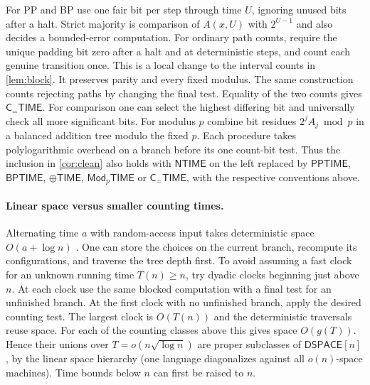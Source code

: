 \documentclass[11pt]{article}
\theoremstyle{definition}
\theoremstyle{remark}
\newcommand{\NTIME}{\mathsf{NTIME}}
\begin{document}
For PP and BP use one fair bit per step through time $U$, ignoring
unused bits after a halt. Strict majority is comparison of $A(x,U)$
with $2^{U-1}$ and also decides a bounded-error computation. For
ordinary path counts, require the unique padding bit zero after a halt
and at deterministic steps, and count each genuine transition once.
This is a local change to the interval counts in \cref{lem:block}.
It preserves parity and every fixed modulus. The same construction
counts rejecting paths by changing the final test. Equality of the
two counts gives $\mathsf C_{=}\mathsf{TIME}$.
For comparison one can select the highest differing bit and universally
check all more significant bits. For modulus $p$ combine bit residues
$2^j A_j\bmod p$ in a balanced addition tree modulo the fixed $p$.
Each procedure takes polylogarithmic overhead on a branch before its
one count-bit test. Thus the inclusion in \cref{cor:clean} also holds
with $\NTIME$ on the left replaced by $\mathsf{PPTIME}$,
$\mathsf{BPTIME}$, $\oplus\mathsf{TIME}$, $\mathsf{Mod}_p\mathsf{TIME}$
or $\mathsf C_{=}\mathsf{TIME}$, with the respective conventions above.

\paragraph{Linear space versus smaller counting times.}
Alternating time $a$ with random-access input takes deterministic
space $O(a+\log n)$ \cite{CKS81}. One can store the choices on the
current branch, recompute its configurations, and traverse the tree
depth first. To avoid assuming a fast clock for an unknown running
time $T(n)\ge n$, try dyadic clocks beginning just above $n$.
At each clock use the same blocked computation with a final test for
an unfinished branch. At the first clock with no unfinished branch,
apply the desired counting test. The largest clock is $O(T(n))$ and
the deterministic traversals reuse space. For each of the counting
classes above this gives space $O(g(T))$. Hence their unions over
$T=o(n\sqrt{\log n})$ are proper subclasses of $\mathsf{DSPACE}[n]$,
by the linear space hierarchy (one language diagonalizes against all
$o(n)$-space machines). Time bounds below $n$ can first be raised to $n$.
\end{document}
